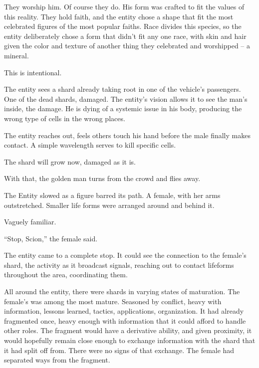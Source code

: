 They worship him.  Of course they do.  His form was crafted to fit the values of this reality.  They hold faith, and the entity chose a shape that fit the most celebrated figures of the most popular faiths.  Race divides this species, so the entity deliberately chose a form that didn't fit any one race, with skin and hair given the color and texture of another thing they celebrated and worshipped – a mineral.



This is intentional.



The entity sees a shard already taking root in one of the vehicle's passengers.  One of the dead shards, damaged.  The entity's vision allows it to see the man's inside, the damage.  He is dying of a systemic issue in his body, producing the wrong type of cells in the wrong places.



The entity reaches out, feels others touch his hand before the male finally makes contact.  A simple wavelength serves to kill specific cells.



The shard will grow now, damaged as it is.



With that, the golden man turns from the crowd and flies away.



\sectionbreak



The Entity slowed as a figure barred its path.  A female, with her arms outstretched.  Smaller life forms were arranged around and behind it.



Vaguely familiar.



``Stop, Scion,'' the female said.



The entity came to a complete stop.  It could see the connection to the female's shard, the activity as it broadcast signals, reaching out to contact lifeforms throughout the area, coordinating them.



All around the entity, there were shards in varying states of maturation.  The female's was among the most mature.  Seasoned by conflict, heavy with information, lessons learned, tactics, applications, organization.  It had already fragmented once, heavy enough with information that it could afford to handle other roles.  The fragment would have a derivative ability, and given proximity, it would hopefully remain close enough to exchange information with the shard that it had split off from.  There were no signs of that exchange.  The female had separated ways from the fragment.



